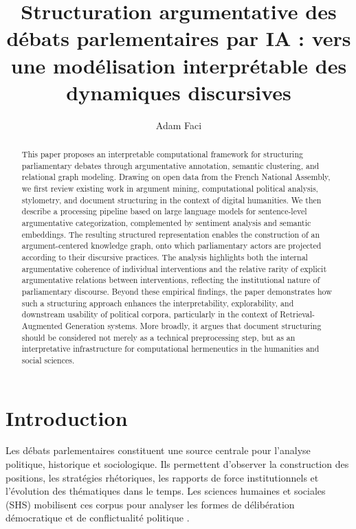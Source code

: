 \documentclass[final, fra]{anthology-ch}      %
\title{Structuration argumentative des débats parlementaires par IA : vers une modélisation interprétable des dynamiques discursives}
\author[1]{Adam Faci}[
  orcid=0000-0001-7216-9487,
  email=adam.faci@huma-num.fr
]
\affiliation{1}{Huma-Num IR* (UAR 3598), CNRS, Paris, France}
\begin{document}
\maketitle

\begin{abstract}
This paper proposes an interpretable computational framework for structuring parliamentary debates through argumentative annotation, semantic clustering, and relational graph modeling. Drawing on open data from the French National Assembly, we first review existing work in argument mining, computational political analysis, stylometry, and document structuring in the context of digital humanities. We then describe a processing pipeline based on large language models for sentence-level argumentative categorization, complemented by sentiment analysis and semantic embeddings. The resulting structured representation enables the construction of an argument-centered knowledge graph, onto which parliamentary actors are projected according to their discursive practices. The analysis highlights both the internal argumentative coherence of individual interventions and the relative rarity of explicit argumentative relations between interventions, reflecting the institutional nature of parliamentary discourse. Beyond these empirical findings, the paper demonstrates how such a structuring approach enhances the interpretability, explorability, and downstream usability of political corpora, particularly in the context of Retrieval-Augmented Generation systems. More broadly, it argues that document structuring should be considered not merely as a technical preprocessing step, but as an interpretative infrastructure for computational hermeneutics in the humanities and social sciences.
\end{abstract}
\vspace{1cm}

\section{Introduction}

Les débats parlementaires constituent une source centrale pour l’analyse politique, historique et sociologique. Ils permettent d’observer la construction des positions, les stratégies rhétoriques, les rapports de force institutionnels et l’évolution des thématiques dans le temps. Les sciences humaines et sociales (SHS) mobilisent ces corpus pour analyser les formes de délibération démocratique et de conflictualité politique \cite{habermas1992,finlayson2007}.
\end{document}
